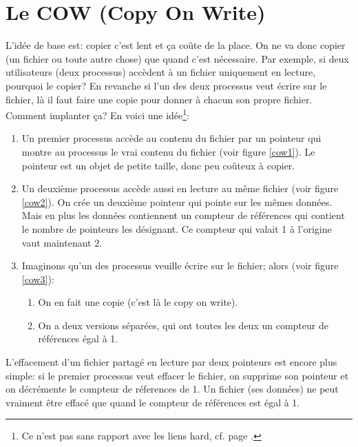 \section{Le COW (Copy On Write)}\label{meuh}
L'idée de base est:  copier c'est
lent et ça coûte de la place. On
ne va donc copier (un fichier ou toute autre chose) que 
quand c'est nécessaire. Par exemple, si deux utilisateurs (deux
processus) accèdent à un fichier uniquement en lecture, pourquoi le
copier?
En revanche si l'un des deux processus veut écrire sur le fichier,
là il faut faire une copie pour donner à chacun son propre
fichier. Comment implanter ça? En voici une idée\footnote{Ce n'est pas sans
rapport avec les \og liens hard\fg{}, cf. page \pageref{hardlink}.}:
\begin{enumerate}
  \item Un premier processus accède au contenu du fichier par un
    pointeur qui montre au 
    processus le \og vrai\fg{} contenu du fichier (voir figure \ref{cow1}).
    Le pointeur est un objet de petite taille, donc peu coûteux à copier.
  \item Un deuxième processus accède aussi en lecture au même fichier
    (voir figure \ref{cow2}). On crée un deuxième pointeur qui pointe
    sur les mêmes 
    données. Mais en plus les données contiennent un compteur de
    références qui contient le nombre de pointeurs les désignant. Ce
    compteur qui valait 1 à l'origine vaut maintenant 2.
  \item Imaginons qu'un des  processus veuille écrire sur le
    fichier; alors (voir figure \ref{cow3}):
    \begin{enumerate}
    \item On en fait une copie (c'est là le \og copy on write\fg).
    \item On a deux versions séparées, qui ont toutes les deux un
      compteur de références égal à 1.
    \end{enumerate}
\end{enumerate}
 L'effacement d'un fichier partagé en lecture par deux pointeurs est
 encore plus simple: si le premier processus veut effacer le fichier,
 on supprime son  pointeur et on décrémente le compteur de réferences
 de 1. Un fichier (ses données) ne peut vraiment être effacé que quand
 le compteur de  références est égal à 1.

